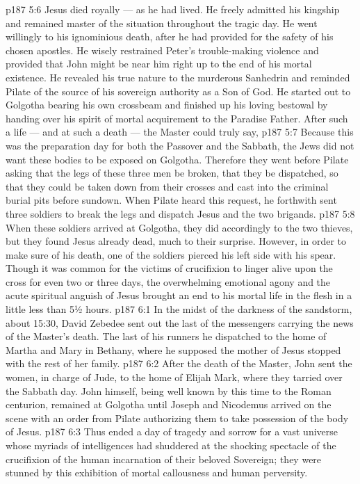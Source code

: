 \vs p187 5:6 \pc Jesus died royally --- as he had lived. He freely admitted his kingship and remained master of the situation throughout the tragic day. He went willingly to his ignominious death, after he had provided for the safety of his chosen apostles. He wisely restrained Peter’s trouble\hyp{}making violence and provided that John might be near him right up to the end of his mortal existence. He revealed his true nature to the murderous Sanhedrin and reminded Pilate of the source of his sovereign authority as a Son of God. He started out to Golgotha bearing his own crossbeam and finished up his loving bestowal by handing over his spirit of mortal acquirement to the Paradise Father. After such a life --- and at such a death --- the Master could truly say, 
\vs p187 5:7 \pc Because this was the preparation day for both the Passover and the Sabbath, the Jews did not want these bodies to be exposed on Golgotha. Therefore they went before Pilate asking that the legs of these three men be broken, that they be dispatched, so that they could be taken down from their crosses and cast into the criminal burial pits before sundown. When Pilate heard this request, he forthwith sent three soldiers to break the legs and dispatch Jesus and the two brigands.
\vs p187 5:8 When these soldiers arrived at Golgotha, they did accordingly to the two thieves, but they found Jesus already dead, much to their surprise. However, in order to make sure of his death, one of the soldiers pierced his left side with his spear. Though it was common for the victims of crucifixion to linger alive upon the cross for even two or three days, the overwhelming emotional agony and the acute spiritual anguish of Jesus brought an end to his mortal life in the flesh in a little less than 5½ hours.
\vs p187 6:1 In the midst of the darkness of the sandstorm, about 15:30, David Zebedee sent out the last of the messengers carrying the news of the Master’s death. The last of his runners he dispatched to the home of Martha and Mary in Bethany, where he supposed the mother of Jesus stopped with the rest of her family.
\vs p187 6:2 After the death of the Master, John sent the women, in charge of Jude, to the home of Elijah Mark, where they tarried over the Sabbath day. John himself, being well known by this time to the Roman centurion, remained at Golgotha until Joseph and Nicodemus arrived on the scene with an order from Pilate authorizing them to take possession of the body of Jesus.
\vs p187 6:3 Thus ended a day of tragedy and sorrow for a vast universe whose myriads of intelligences had shuddered at the shocking spectacle of the crucifixion of the human incarnation of their beloved Sovereign; they were stunned by this exhibition of mortal callousness and human perversity.
